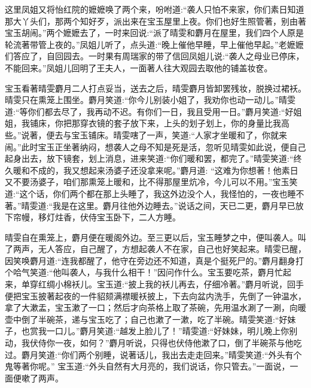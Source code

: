 \begin{parag}
    这里凤姐又将怡红院的嬷嬷唤了两个来，吩咐道:“袭人只怕不来家，你们素日知道那大丫头们，那两个知好歹，派出来在宝玉屋里上夜。你们也好生照管著，别由著宝玉胡闹。”两个嬷嬷去了，一时来回说:“派了晴雯和麝月在屋里，我们四个人原是轮流著带管上夜的。”凤姐儿听了，点头道:“晚上催他早睡，早上催他早起。”老嬷嬷们答应了，自回园去。一时果有周瑞家的带了信回凤姐儿说:“袭人之母业已停床，不能回来。”凤姐儿回明了王夫人，一面著人往大观园去取他的铺盖妆奁。
\end{parag}


\begin{parag}
    宝玉看著晴雯麝月二人打点妥当，送去之后，晴雯麝月皆卸罢残妆，脱换过裙袄。晴雯只在熏笼上围坐。麝月笑道:“你今儿别装小姐了，我劝你也动一动儿。”晴雯道:“等你们都去尽了，我再动不迟。有你们一日，我且受用一日。”麝月笑道:“好姐姐，我铺床，你把那穿衣镜的套子放下来，上头的划子划上，你的身量比我高些。”说著，便去与宝玉铺床。晴雯嗐了一声，笑道:“人家才坐暖和了，你就来闹。”此时宝玉正坐著纳闷，想袭人之母不知是死是活，忽听见晴雯如此说，便自己起身出去，放下镜套，划上消息，进来笑道:“你们暖和罢，都完了。”晴雯笑道:“终久暖和不成的，我又想起来汤婆子还没拿来呢。”麝月道: “这难为你想著！他素日又不要汤婆子，咱们那熏笼上暖和，比不得那屋里炕冷，今儿可以不用。”宝玉笑道:“这个话，你们两个都在那上头睡了，我这外边没个人，我怪怕的，一夜也睡不著。”晴雯道:“我是在这里。麝月往他外边睡去。”说话之间，天已二更，麝月早已放下帘幔，移灯炷香，伏侍宝玉卧下，二人方睡。
\end{parag}


\begin{parag}
    晴雯自在熏笼上，麝月便在暖阁外边。至三更以后，宝玉睡梦之中，便叫袭人。叫了两声，无人答应，自己醒了，方想起袭人不在家，自己也好笑起来。晴雯已醒，因笑唤麝月道:“连我都醒了，他守在旁边还不知道，真是个挺死尸的。”麝月翻身打个哈气笑道:“他叫袭人，与我什么相干！”因问作什么。宝玉要吃茶，麝月忙起来，单穿红绸小棉袄儿。宝玉道:“披上我的袄儿再去，仔细冷著。”麝月听说，回手便把宝玉披著起夜的一件貂颏满襟暖袄披上，下去向盆内洗手，先倒了一钟温水，拿了大漱盂，宝玉漱了一口；然后才向茶格上取了茶碗，先用温水涮了一涮，向暖壶中倒了半碗茶，递与宝玉吃了；自己也漱了一漱，吃了半碗。晴雯笑道:“好妹子，也赏我一口儿。”麝月笑道:“越发上脸儿了！”晴雯道:“好妹妹，明儿晚上你别动，我伏侍你一夜，如何？”麝月听说，只得也伏侍他漱了口，倒了半碗茶与他吃过。麝月笑道:“你们两个别睡，说著话儿，我出去走走回来。”晴雯笑道:“外头有个鬼等著你呢。” 宝玉道:“外头自然有大月亮的，我们说话，你只管去。”一面说，一面便嗽了两声。
\end{parag}


